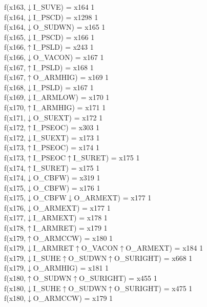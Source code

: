 f(x163,$\downarrow$I\_SUVE) = x164 {1} \\
f(x164,$\downarrow$I\_PSCD) = x1298 {1} \\
f(x164,$\downarrow$O\_SUDWN) = x165 {1} \\
f(x165,$\downarrow$I\_PSCD) = x166 {1} \\
f(x166,$\uparrow$I\_PSLD) = x243 {1} \\
f(x166,$\downarrow$O\_VACON) = x167 {1} \\
f(x167,$\uparrow$I\_PSLD) = x168 {1} \\
f(x167,$\uparrow$O\_ARMHIG) = x169 {1} \\
f(x168,$\downarrow$I\_PSLD) = x167 {1} \\
f(x169,$\downarrow$I\_ARMLOW) = x170 {1} \\
f(x170,$\uparrow$I\_ARMHIG) = x171 {1} \\
f(x171,$\downarrow$O\_SUEXT) = x172 {1} \\
f(x172,$\uparrow$I\_PSEOC) = x303 {1} \\
f(x172,$\downarrow$I\_SUEXT) = x173 {1} \\
f(x173,$\uparrow$I\_PSEOC) = x174 {1} \\
f(x173,$\uparrow$I\_PSEOC$\uparrow$I\_SURET) = x175 {1} \\
f(x174,$\uparrow$I\_SURET) = x175 {1} \\
f(x174,$\downarrow$O\_CBFW) = x319 {1} \\
f(x175,$\downarrow$O\_CBFW) = x176 {1} \\
f(x175,$\downarrow$O\_CBFW$\downarrow$O\_ARMEXT) = x177 {1} \\
f(x176,$\downarrow$O\_ARMEXT) = x177 {1} \\
f(x177,$\downarrow$I\_ARMEXT) = x178 {1} \\
f(x178,$\uparrow$I\_ARMRET) = x179 {1} \\
f(x179,$\uparrow$O\_ARMCCW) = x180 {1} \\
f(x179,$\downarrow$I\_ARMRET$\uparrow$O\_VACON$\uparrow$O\_ARMEXT) = x184 {1} \\
f(x179,$\downarrow$I\_SUHE$\uparrow$O\_SUDWN$\uparrow$O\_SURIGHT) = x668 {1} \\
f(x179,$\downarrow$O\_ARMHIG) = x181 {1} \\
f(x180,$\uparrow$O\_SUDWN$\uparrow$O\_SURIGHT) = x455 {1} \\
f(x180,$\downarrow$I\_SUHE$\uparrow$O\_SUDWN$\uparrow$O\_SURIGHT) = x475 {1} \\
f(x180,$\downarrow$O\_ARMCCW) = x179 {1} \\
